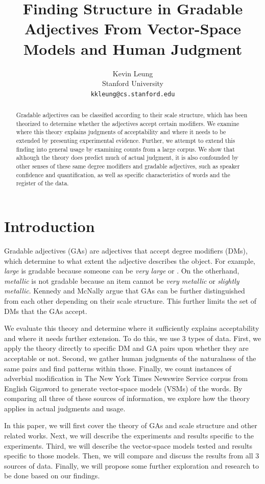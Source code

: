 \documentclass[11pt]{article}
\title{Finding Structure in Gradable Adjectives From Vector-Space Models and Human Judgment}
\author{
  Kevin Leung \\
  Stanford University \\
  {\tt kkleung@cs.stanford.edu}}
\date{}
\begin{document}
\maketitle
\begin{abstract}
Gradable adjectives can be classified according to their scale structure, which has been theorized to determine whether the adjectives accept certain modifiers. We examine where this theory explains judgments of acceptability and where it needs to be extended by presenting experimental evidence. Further, we attempt to extend this finding into general usage by examining counts from a large corpus. We show that although the theory does predict much of actual judgment, it is also confounded by other senses of these same degree modifiers and gradable adjectives, such as speaker confidence and quantification, as well as specific characteristics of words and the register of the data.
\end{abstract}

\section{Introduction}

Gradable adjectives (GAs) are adjectives that accept degree modifiers (DMs), which determine to what extent the adjective describes the object. For example, \textit{large} is gradable because someone can be \textit{very large} or . On the otherhand, \textit{metallic} is not gradable because an item cannot be \textit{very metallic} or \textit{slightly metallic}. Kennedy and McNally  argue that GAs can be further distinguished from each other depending on their scale structure. This further limits the set of DMs that the GAs accept.

We evaluate this theory and determine where it sufficiently explains acceptability and where it needs further extension. To do this, we use 3 types of data. First, we apply the theory directly to specific DM and GA pairs upon whether they are acceptable or not. Second, we gather human judgments of the naturalness of the same pairs and find patterns within those. Finally, we count instances of adverbial modification in The New York Times Newswire Service corpus from English Gigaword to generate vector-space models (VSMs) of the words. By comparing all three of these sources of information, we explore how the theory applies in actual judgments and usage.

In this paper, we will first cover the theory of GAs and scale structure and other related works. Next, we will describe the experiments and results specific to the experiments. Third, we will describe the vector-space models tested and results specific to those models. Then, we will compare and discuss the results from all 3 sources of data. Finally, we will propose some further exploration and research to be done based on our findings.
\end{document}
